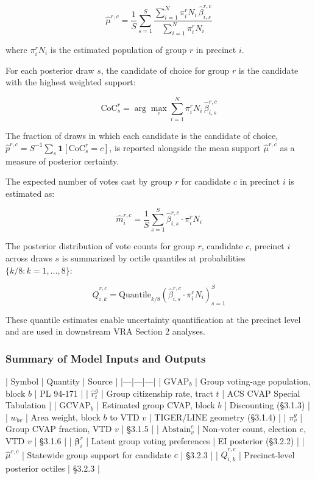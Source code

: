 \documentclass[sn-vancouver,Numbered]{sn-jnl}
\theoremstyle{thmstyleone}%
\theoremstyle{thmstyletwo}%
\theoremstyle{thmstylethree}%
\begin{document}
\begin{equation}
\hat{\mu}^{r,c} = \frac{1}{S} \sum_{s=1}^{S} \frac{\sum_{i=1}^{N} \pi^r_i N_i \,\hat{\beta}^{r,c}_{i,s}}{\sum_{i=1}^{N} \pi^r_i N_i}
\label{eq:statewide_group_preferences}
\end{equation}


where $\pi^r_i N_i$ is the estimated population of group $r$ in precinct $i$.

 For each posterior draw $s$, the candidate of choice for group $r$ is the candidate with the highest weighted support:

\begin{equation}
\text{CoC}^r_s = \arg\max_c \sum_{i=1}^{N} \pi^r_i N_i \,\hat{\beta}^{r,c}_{i,s}
\label{equation:coc}
\end{equation}


The fraction of draws in which each candidate is the candidate of choice, $\hat{p}^{r,c} = S^{-1}\sum_s \mathbf{1}[\text{CoC}^r_s = c]$, is reported alongside the mean support $\hat{\mu}^{r,c}$ as a measure of posterior certainty.

The expected number of votes cast by group $r$ for candidate $c$ in precinct $i$ is estimated as:

\begin{equation}
\hat{m}^{r,c}_i = \frac{1}{S} \sum_{s=1}^{S} \hat{\beta}^{r,c}_{i,s} \cdot \pi^r_i N_i
\label{eq:precinctlevelmeanvotecounts}
\end{equation}

The posterior distribution of vote counts for group $r$, candidate $c$, precinct $i$ across draws $s$ is summarized by octile quantiles at probabilities $\{k/8 : k = 1, \ldots, 8\}$:

\begin{equation}
\hat{Q}^{r,c}_{i,k} = \text{Quantile}_{k/8}\!\left(\hat{\beta}^{r,c}_{i,s} \cdot \pi^r_i N_i\right)_{s=1}^{S}
\label{eq:precinctlevelquantiles}
\end{equation}

These quantile estimates enable uncertainty quantification at the precinct level and are used in downstream VRA Section 2 analyses.

\subsubsection{Summary of Model Inputs and Outputs}
| Symbol | Quantity | Source |
|---|---|---|
| $\text{GVAP}_b$ | Group voting-age population, block $b$ | PL 94-171 |
| $\hat{r}^g_t$ | Group citizenship rate, tract $t$ | ACS CVAP Special Tabulation |
| $\text{GCVAP}_b$ | Estimated group CVAP, block $b$ | Discounting (§3.1.3) |
| $w_{bv}$ | Area weight, block $b$ to VTD $v$ | TIGER/LINE geometry (§3.1.4) |
| $\pi^g_v$ | Group CVAP fraction, VTD $v$ | §3.1.5 |
| $\text{Abstain}^e_v$ | Non-voter count, election $e$, VTD $v$ | §3.1.6 |
| $\boldsymbol{\beta}^r_i$ | Latent group voting preferences | EI posterior (§3.2.2) |
| $\hat{\mu}^{r,c}$ | Statewide group support for candidate $c$ | §3.2.3 |
| $\hat{Q}^{r,c}_{i,k}$ | Precinct-level posterior octiles | §3.2.3 |
\end{document}
